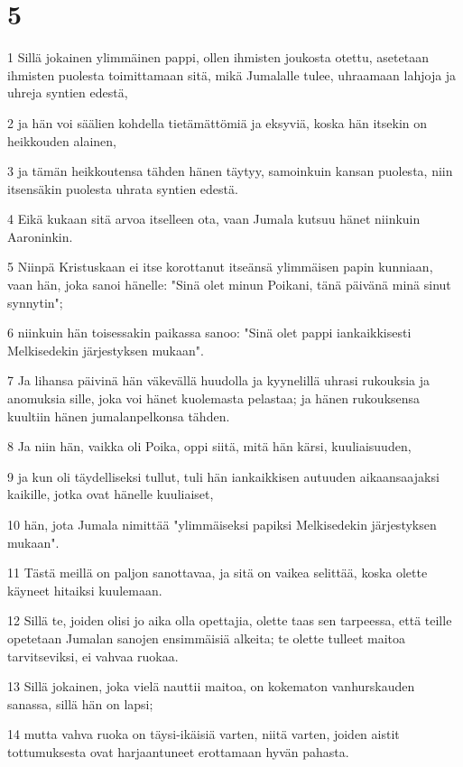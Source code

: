 \chapter{5}

\par 1 Sillä jokainen ylimmäinen pappi, ollen ihmisten joukosta otettu, asetetaan ihmisten puolesta toimittamaan sitä, mikä Jumalalle tulee, uhraamaan lahjoja ja uhreja syntien edestä,
\par 2 ja hän voi säälien kohdella tietämättömiä ja eksyviä, koska hän itsekin on heikkouden alainen,
\par 3 ja tämän heikkoutensa tähden hänen täytyy, samoinkuin kansan puolesta, niin itsensäkin puolesta uhrata syntien edestä.
\par 4 Eikä kukaan sitä arvoa itselleen ota, vaan Jumala kutsuu hänet niinkuin Aaroninkin.
\par 5 Niinpä Kristuskaan ei itse korottanut itseänsä ylimmäisen papin kunniaan, vaan hän, joka sanoi hänelle: "Sinä olet minun Poikani, tänä päivänä minä sinut synnytin";
\par 6 niinkuin hän toisessakin paikassa sanoo: "Sinä olet pappi iankaikkisesti Melkisedekin järjestyksen mukaan".
\par 7 Ja lihansa päivinä hän väkevällä huudolla ja kyynelillä uhrasi rukouksia ja anomuksia sille, joka voi hänet kuolemasta pelastaa; ja hänen rukouksensa kuultiin hänen jumalanpelkonsa tähden.
\par 8 Ja niin hän, vaikka oli Poika, oppi siitä, mitä hän kärsi, kuuliaisuuden,
\par 9 ja kun oli täydelliseksi tullut, tuli hän iankaikkisen autuuden aikaansaajaksi kaikille, jotka ovat hänelle kuuliaiset,
\par 10 hän, jota Jumala nimittää "ylimmäiseksi papiksi Melkisedekin järjestyksen mukaan".
\par 11 Tästä meillä on paljon sanottavaa, ja sitä on vaikea selittää, koska olette käyneet hitaiksi kuulemaan.
\par 12 Sillä te, joiden olisi jo aika olla opettajia, olette taas sen tarpeessa, että teille opetetaan Jumalan sanojen ensimmäisiä alkeita; te olette tulleet maitoa tarvitseviksi, ei vahvaa ruokaa.
\par 13 Sillä jokainen, joka vielä nauttii maitoa, on kokematon vanhurskauden sanassa, sillä hän on lapsi;
\par 14 mutta vahva ruoka on täysi-ikäisiä varten, niitä varten, joiden aistit tottumuksesta ovat harjaantuneet erottamaan hyvän pahasta.

